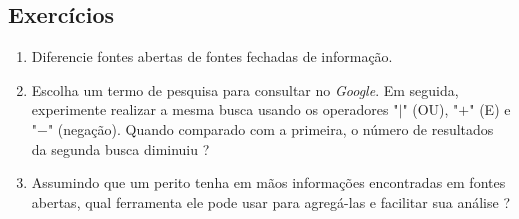     \subsection{Exercícios}
    
    \begin{example} \label{cap6_exercicios}
        \begin{enumerate}
            \item Diferencie fontes abertas de fontes fechadas de informação.
            \item Escolha um termo de pesquisa para consultar no \textit{Google}. Em seguida, experimente realizar a mesma busca usando os operadores "$|$" (OU), "$+$" (E) e "$-$" (negação). Quando comparado com a primeira, o número de resultados da segunda busca diminuiu ?
            \item Assumindo que um perito tenha em mãos informações encontradas em fontes abertas, qual ferramenta ele pode usar para agregá-las e facilitar sua análise ?
        \end{enumerate}
    \end{example}

\newpage